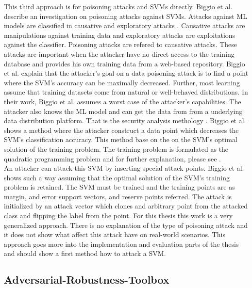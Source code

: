 This third approach is for poisoning attacks and SVMs directly. Biggio et al. \cite{DBLP:conf/icml/BiggioNL12} describe an investigation on poisoning attacks against SVMs. Attacks against ML models are classified in causative and exploratory attacks \cite{DBLP:conf/ccs/BarrenoNSJT06}. Causative attacks are manipulations against training data and exploratory attacks are exploitations against the classifier. Poisoning attacks are refered to causative attacks. These attacks are important when the attacker have no direct access to the training database and provides his own training data from a web-based repository. Biggio et al. explain that the attacker's goal on a data poisoning attack is to find a point where the SVM's accuracy can be maximally decreased. Further, most learning assume that training datasets come from natural or well-behaved distributions. In their work, Biggio et al. assumes a worst case of the attacker's capabilities. The attacker also knows the ML model and can get the data from from a underlying data distribution platform. That is the security analysis methology \cite{DBLP:journals/ml/BarrenoNJT10}. Biggio et al. shows a method where the attacker construct a data point which decreases the SVM's classification accuracy. This method base on the on the SVM's optimal solution of the training problem. The training problem is formulated as the quadratic
programming problem and for further explanation, please see \cite{Papadonikolakis2009PerformanceCO}. \\
An attacker can attack this SVM by inserting special attack points. Biggio et al. shows such a way assuming that the optimal solution of the SVM's training problem is retained. The SVM must be trained and the training points are as margin, and error support vectors, and reserve points referred. The attack is initialized by an attack vector which clones and arbitrary point from the attacked class and flipping the label from the point. For this thesis this work is a very generalized approach. There is no explanation of the type of poisoning attack and it does not show what affect this attack have on real-world scenarios. This approach goes more into the implementation and evaluation parts of the thesis and should show a first method how to attack a SVM.


\subsection{Adversarial-Robustness-Toolbox}

